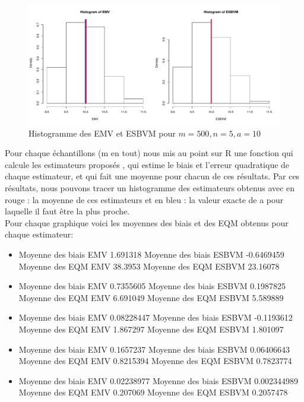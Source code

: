 \documentclass[12pt]{article}
\begin{document}
\begin{enumerate}
\begin{figure}[!h]
\centering
\includegraphics[width=1.0\textwidth]{figures/GraphP2Q35.pdf}
\caption{Histogramme des EMV et ESBVM pour $m=500, n=5, a=10$}
\end{figure}

Pour chaque \'{e}chantillons (m en tout) nous mis au point sur R une fonction qui calcule les estimateurs propos\'{e}s , qui estime le biais et l'erreur quadratique de chaque estimateur, et qui fait une moyenne pour chacun de ces r\'{e}sultats. Par ces r\'{e}sultats, nous pouvons tracer un histogramme des estimateurs obtenus avec en rouge : la moyenne de ces estimateurs et en bleu : la valeur exacte de a pour laquelle il faut \^{e}tre la plus proche.
\\

Pour chaque graphique voici les moyennes des biais et des EQM obtenus pour chaque estimateur:
\begin{itemize}
\item Moyenne des biais EMV 1.691318 
Moyenne des biais ESBVM -0.6469459 
Moyenne des EQM EMV 38.3953 
Moyenne des EQM ESBVM 23.16078 
\item Moyenne des biais EMV 0.7355605 
Moyenne des biais ESBVM 0.1987825 
Moyenne des EQM EMV 6.691049 
Moyenne des EQM ESBVM 5.589889 
\item Moyenne des biais EMV 0.08228447 
Moyenne des biais ESBVM -0.1193612 
Moyenne des EQM EMV 1.867297 
Moyenne des EQM ESBVM 1.801097 
\item Moyenne des biais EMV 0.1657237 
Moyenne des biais ESBVM 0.06406643 
Moyenne des EQM EMV 0.8215394 
Moyenne des EQM ESBVM 0.7823774 
\item Moyenne des biais EMV 0.02238977 
Moyenne des biais ESBVM 0.002344989 
Moyenne des EQM EMV 0.207069 
Moyenne des EQM ESBVM 0.2057478 
\\
\end{itemize}



\end{enumerate}
\end{document}
